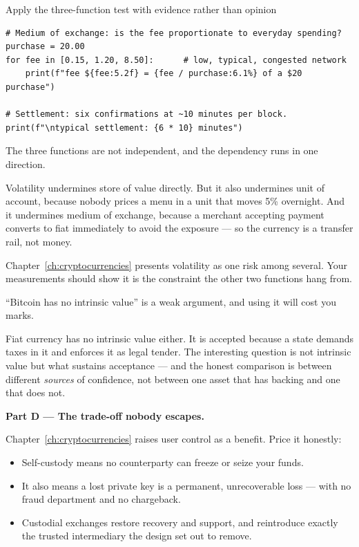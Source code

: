 \begin{labproject}{Apply the three-function test with evidence rather than opinion}
\begin{lstlisting}[style=mlpython]
# Medium of exchange: is the fee proportionate to everyday spending?
purchase = 20.00
for fee in [0.15, 1.20, 8.50]:      # low, typical, congested network
    print(f"fee ${fee:5.2f} = {fee / purchase:6.1%} of a $20 purchase")

# Settlement: six confirmations at ~10 minutes per block.
print(f"\ntypical settlement: {6 * 10} minutes")
\end{lstlisting}

\begin{keyidea}
The three functions are not independent, and the dependency runs in one direction.

Volatility undermines store of value directly. But it also undermines unit of account, because nobody prices a menu in a unit that moves 5\% overnight. And it undermines medium of exchange, because a merchant accepting payment converts to fiat immediately to avoid the exposure --- so the currency is a transfer rail, not money.

Chapter~\ref{ch:cryptocurrencies} presents volatility as one risk among several. Your measurements should show it is the constraint the other two functions hang from.
\end{keyidea}

\begin{pitfall}
``Bitcoin has no intrinsic value'' is a weak argument, and using it will cost you marks.

Fiat currency has no intrinsic value either. It is accepted because a state demands taxes in it and enforces it as legal tender. The interesting question is not intrinsic value but what sustains acceptance --- and the honest comparison is between different \emph{sources} of confidence, not between one asset that has backing and one that does not.
\end{pitfall}

\medskip\noindent\textbf{Part D --- The trade-off nobody escapes.}\par
Chapter~\ref{ch:cryptocurrencies} raises user control as a benefit. Price it honestly:

\begin{itemize}
  \item Self-custody means no counterparty can freeze or seize your funds.
  \item It also means a lost private key is a permanent, unrecoverable loss --- with no fraud department and no chargeback.
  \item Custodial exchanges restore recovery and support, and reintroduce exactly the trusted intermediary the design set out to remove.
\end{itemize}


\end{labproject}

